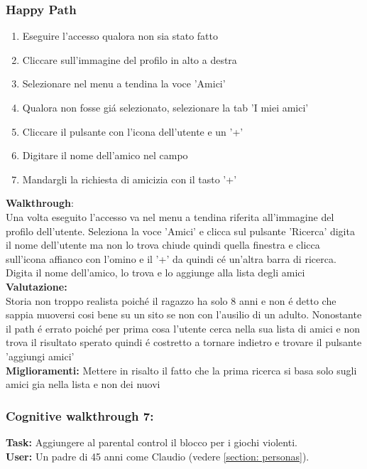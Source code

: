 \documentclass[../Report.tex]{subfiles}
\begin{document}
    \subsubsection{Happy Path}
    \begin{enumerate}
        \item Eseguire l'accesso qualora non sia stato fatto 
        \item Cliccare sull'immagine del profilo in alto a destra
        \item Selezionare nel menu a tendina la voce 'Amici'
        \item Qualora non fosse giá selezionato, selezionare la tab 'I miei amici'
        \item Cliccare il pulsante con l'icona dell'utente e un '+'
        \item Digitare il nome dell'amico nel campo
        \item Mandargli la richiesta di amicizia con il tasto '+'
    \end{enumerate}
    \textbf{Walkthrough}:\\
    Una volta eseguito l'accesso va nel menu a tendina riferita all'immagine del profilo dell'utente.
    Seleziona la voce 'Amici' e clicca sul pulsante 'Ricerca' digita il nome dell'utente ma non lo trova chiude quindi quella finestra e clicca sull'icona affianco con l'omino e il '+' da quindi cé un'altra barra di ricerca.
    Digita il nome dell'amico, lo trova e lo aggiunge alla lista degli amici\\

    \textbf{Valutazione:}\\Storia non troppo realista poiché il ragazzo ha solo 8 anni e non é detto che sappia muoversi cosi bene su un sito se non con l'ausilio di un adulto.
    Nonostante il path é errato poiché per prima cosa l'utente cerca nella sua lista di amici e non trova il risultato sperato quindi é costretto a tornare indietro e trovare il pulsante 'aggiungi amici'\\

    \textbf{Miglioramenti:} Mettere in risalto il fatto che la prima ricerca si basa solo sugli amici gia nella lista e non dei nuovi

    \subsubsection{Cognitive walkthrough 7:}
    \textbf{Task:} Aggiungere al parental control il blocco per i giochi violenti.\\
    \textbf{User:} Un padre di 45 anni come Claudio (vedere \ref{section: personas}).\\
\end{document}
